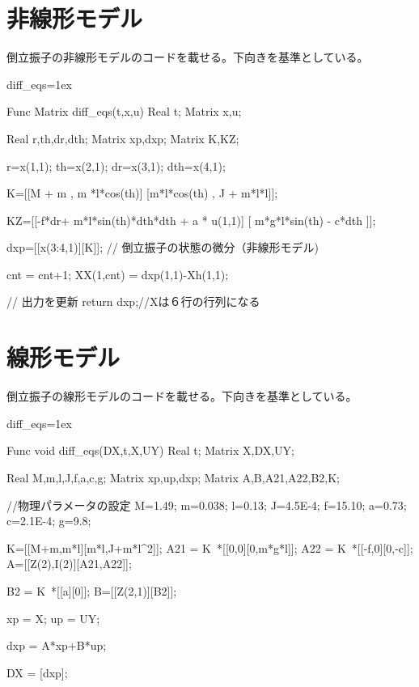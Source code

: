 \section{非線形モデル}
	倒立振子の非線形モデルのコードを載せる。下向きを基準としている。
	\begin{breakitembox}[l]{diff\_eqs}\baselineskip=1ex
		\begin{verbatimtab}[4]
		
Func Matrix diff_eqs(t,x,u)
Real t;
Matrix x,u;
{
	Real r,th,dr,dth;
	Matrix xp,dxp;
	Matrix K,KZ;

	r=x(1,1);
	th=x(2,1);
	dr=x(3,1);
	dth=x(4,1);

	K=[[M + m , m *l*cos(th)]
	   [m*l*cos(th) , J + m*l*l]];

	KZ=[[-f*dr+ m*l*sin(th)*dth*dth + a * u(1,1)]
		[ m*g*l*sin(th) - c*dth ]];
	
	dxp=[[x(3:4,1)][K\KZ]]; // 倒立振子の状態の微分（非線形モデル)

	cnt = cnt+1;
	XX(1,cnt) = dxp(1,1)-Xh(1,1);
	
	// 出力を更新
	return dxp;//Xは６行の行列になる
}
		\end{verbatimtab}
	\end{breakitembox}
\section{線形モデル}
	倒立振子の線形モデルのコードを載せる。下向きを基準としている。
	\begin{breakitembox}[l]{diff\_eqs}\baselineskip=1ex
		\begin{verbatimtab}[4]
		
Func void diff_eqs(DX,t,X,UY)
Real t;
Matrix X,DX,UY;
{
	Real M,m,l,J,f,a,c,g;
	Matrix xp,up,dxp;
	Matrix A,B,A21,A22,B2,K;
	
	//物理パラメータの設定
	M=1.49;   m=0.038; l=0.13;
	J=4.5E-4; f=15.10; a=0.73;
	c=2.1E-4; g=9.8;
	
	K=[[M+m,m*l][m*l,J+m*l^2]];
	A21 = K~*[[0,0][0,m*g*l]];
	A22 = K~*[[-f,0][0,-c]];
	A=[[Z(2),I(2)][A21,A22]];
	
	B2 = K~*[[a][0]];
	B=[[Z(2,1)][B2]];
	
	xp = X;
	up = UY;
	
	dxp = A*xp+B*up;
	
	DX = [dxp];

}
		\end{verbatimtab}
	\end{breakitembox}
